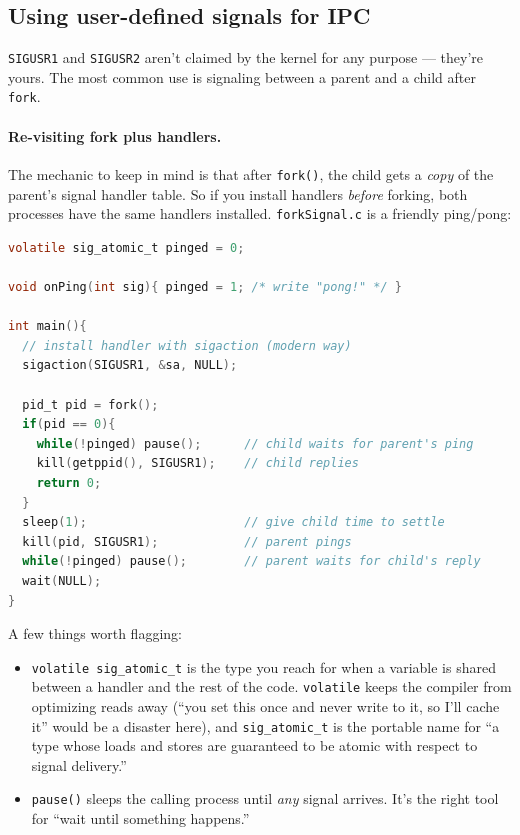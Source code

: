 \documentclass[11pt]{article}
\begin{document}
\subsection*{Using user-defined signals for IPC}

\texttt{SIGUSR1} and \texttt{SIGUSR2} aren't claimed by the kernel
for any purpose --- they're yours. The most common use is signaling
between a parent and a child after \texttt{fork}.

\paragraph{Re-visiting fork plus handlers.} The mechanic to keep in
mind is that after \texttt{fork()}, the child gets a \emph{copy} of
the parent's signal handler table. So if you install handlers
\emph{before} forking, both processes have the same handlers
installed. \texttt{forkSignal.c} is a friendly ping/pong:

\begin{lstlisting}[language=C]
volatile sig_atomic_t pinged = 0;

void onPing(int sig){ pinged = 1; /* write "pong!" */ }

int main(){
  // install handler with sigaction (modern way)
  sigaction(SIGUSR1, &sa, NULL);

  pid_t pid = fork();
  if(pid == 0){
    while(!pinged) pause();      // child waits for parent's ping
    kill(getppid(), SIGUSR1);    // child replies
    return 0;
  }
  sleep(1);                      // give child time to settle
  kill(pid, SIGUSR1);            // parent pings
  while(!pinged) pause();        // parent waits for child's reply
  wait(NULL);
}
\end{lstlisting}

A few things worth flagging:
\begin{itemize}
  \item \texttt{volatile sig\_atomic\_t} is the type you reach for
    when a variable is shared between a handler and the rest of the
    code. \texttt{volatile} keeps the compiler from optimizing reads
    away (``you set this once and never write to it, so I'll cache
    it'' would be a disaster here), and \texttt{sig\_atomic\_t} is the
    portable name for ``a type whose loads and stores are guaranteed
    to be atomic with respect to signal delivery.''
  \item \texttt{pause()} sleeps the calling process until \emph{any}
    signal arrives. It's the right tool for ``wait until something
    happens.''
\end{itemize}
\end{document}
